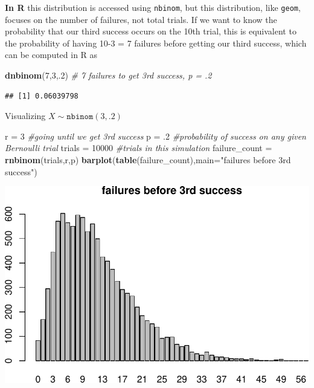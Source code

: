\documentclass[
]{book}
\newenvironment{Shaded}{\begin{snugshade}}{\end{snugshade}}
\newcommand{\AttributeTok}[1]{\textcolor[rgb]{0.13,0.29,0.53}{#1}}
\newcommand{\CommentTok}[1]{\textcolor[rgb]{0.56,0.35,0.01}{\textit{#1}}}
\newcommand{\DecValTok}[1]{\textcolor[rgb]{0.00,0.00,0.81}{#1}}
\newcommand{\FunctionTok}[1]{\textcolor[rgb]{0.13,0.29,0.53}{\textbf{#1}}}
\newcommand{\NormalTok}[1]{#1}
\newcommand{\OtherTok}[1]{\textcolor[rgb]{0.56,0.35,0.01}{#1}}
\newcommand{\StringTok}[1]{\textcolor[rgb]{0.31,0.60,0.02}{#1}}
\theoremstyle{definition}
\theoremstyle{definition}
\theoremstyle{definition}
\theoremstyle{definition}
\theoremstyle{remark}
\begin{document}
\textbf{In R} this distribution is accessed using \texttt{nbinom}, but this distribution, like \texttt{geom}, focuses on the number of failures, not total trials. If we want to know the probability that our third success occurs on the 10th trial, this is equivalent to the probability of having 10-3 = 7 failures before getting our third success, which can be computed in R as

\begin{Shaded}
\begin{Highlighting}[]
\FunctionTok{dnbinom}\NormalTok{(}\DecValTok{7}\NormalTok{,}\DecValTok{3}\NormalTok{,.}\DecValTok{2}\NormalTok{) }\CommentTok{\# 7 failures to get 3rd success, p = .2}
\end{Highlighting}
\end{Shaded}

\begin{verbatim}
## [1] 0.06039798
\end{verbatim}

Visualizing \(X \sim \texttt{nbinom}(3,.2)\)

\begin{Shaded}
\begin{Highlighting}[]
\NormalTok{r }\OtherTok{=} \DecValTok{3} \CommentTok{\#going until we get 3rd success}
\NormalTok{p }\OtherTok{=}\NormalTok{ .}\DecValTok{2} \CommentTok{\#probability of success on any given Bernoulli trial}
\NormalTok{trials }\OtherTok{=} \DecValTok{10000} \CommentTok{\#trials in this simulation}
\NormalTok{failure\_count }\OtherTok{=} \FunctionTok{rnbinom}\NormalTok{(trials,r,p)}
\FunctionTok{barplot}\NormalTok{(}\FunctionTok{table}\NormalTok{(failure\_count),}\AttributeTok{main=}\StringTok{"failures before 3rd success"}\NormalTok{)}
\end{Highlighting}
\end{Shaded}

\includegraphics{math340-notes_files/figure-latex/unnamed-chunk-170-1.pdf}
\end{document}

